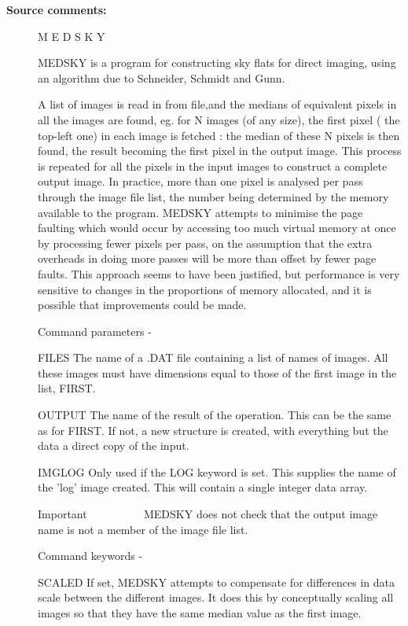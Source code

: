 \begin{description}
\begin{description}
\item [\textbf{Source comments:}]
\begin{terminalv}
 M E D S K Y

 MEDSKY is a program for constructing sky flats for direct imaging,
 using an algorithm due to Schneider, Schmidt and Gunn.

 A list of images is read in from file,and the medians of
 equivalent pixels in all the images are found, eg. for N images
 (of any size), the first pixel ( the top-left one) in each image
 is fetched : the median of these N pixels is then found, the
 result becoming the first pixel in the output image. This process
 is repeated for all the pixels in the input images to construct a
 complete output image. In practice, more than one pixel is
 analysed per pass through the image file list, the number being
 determined by the memory available to the program. MEDSKY attempts
 to minimise the page faulting which would occur by accessing too
 much virtual memory at once by processing fewer pixels per pass,
 on the assumption that the extra overheads in doing more passes
 will be more than offset by fewer page faults. This approach seems
 to have been justified, but performance is very sensitive to
 changes in the proportions of memory allocated, and it is possible
 that improvements could be made.

 Command parameters -

 FILES  The name of a .DAT file containing a list of names
        of images. All these images must have dimensions
        equal to those of the first image in the list, FIRST.

 OUTPUT The name of the result of the operation.  This can
        be the same as for FIRST.  If not, a new structure
        is created, with everything but the data a direct
        copy of the input.

 IMGLOG Only used if the LOG keyword is set.  This supplies
        the name of the 'log' image created.  This will contain
        a single integer data array.

 Important
 ~~~~~~~~~
 MEDSKY does not check that the output image name is not a member
 of the image file list.

 Command keywords  -

 SCALED If set, MEDSKY attempts to compensate for differences
        in data scale between the different images.  It does this
        by conceptually scaling all images so that they have the
        same median value as the first image.


\end{terminalv}
\end{description}
\end{description}
